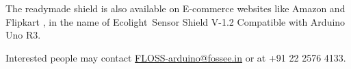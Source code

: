 
The readymade shield is also available on E-commerce websites like Amazon \cite{amazon-shield}
and Flipkart \cite{flipkart-shield}, in the name of Ecolight\textregistered \ Sensor Shield V-1.2
Compatible with Arduino Uno R3.

Interested people may contact
\href{mailto:FLOSS-arduino@fossee.in}{FLOSS-arduino@fossee.in} or at
+91 22 2576 4133.





